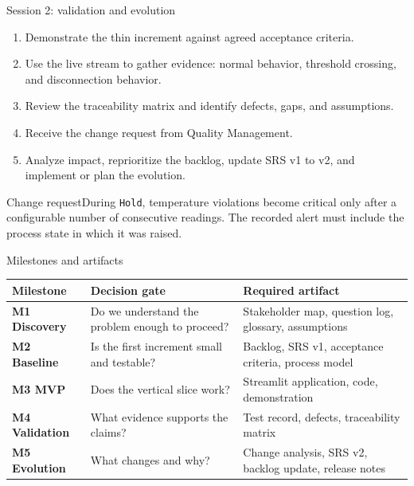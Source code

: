 \begin{frame}{Session 2: validation and evolution}
\begin{enumerate}
\item Demonstrate the thin increment against agreed acceptance criteria.
\item Use the live stream to gather evidence: normal behavior, threshold crossing, and disconnection behavior.
\item Review the traceability matrix and identify defects, gaps, and assumptions.
\item Receive the change request from Quality Management.
\item Analyze impact, reprioritize the backlog, update SRS v1 to v2, and implement or plan the evolution.
\end{enumerate}
\begin{block}{Change request}During \texttt{Hold}, temperature violations become critical only after a configurable number of consecutive readings. The recorded alert must include the process state in which it was raised.\end{block}
\coursefooter
\end{frame}

\begin{frame}{Milestones and artifacts}
\begin{tabularx}{\textwidth}{>{\bfseries}l X X}
Milestone & Decision gate & Required artifact \\
\toprule
M1 Discovery & Do we understand the problem enough to proceed? & Stakeholder map, question log, glossary, assumptions \\
M2 Baseline & Is the first increment small and testable? & Backlog, SRS v1, acceptance criteria, process model \\
M3 MVP & Does the vertical slice work? & Streamlit application, code, demonstration \\
M4 Validation & What evidence supports the claims? & Test record, defects, traceability matrix \\
M5 Evolution & What changes and why? & Change analysis, SRS v2, backlog update, release notes \\
\bottomrule
\end{tabularx}
\coursefooter
\end{frame}

